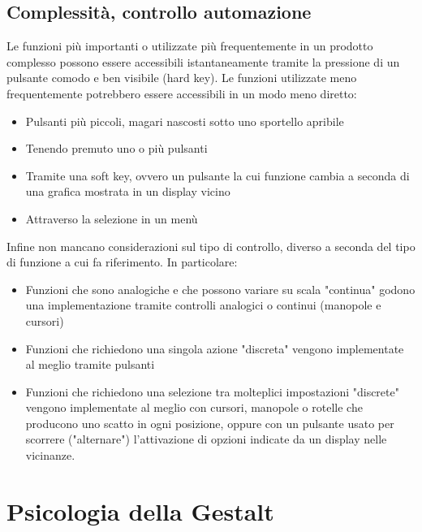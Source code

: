 \documentclass[11pt,a4paper]{article}
\begin{document}
\subsection{Complessità, controllo automazione}
Le funzioni più importanti o utilizzate più frequentemente in un prodotto complesso possono essere accessibili istantaneamente tramite la pressione di un pulsante comodo e ben visibile (hard key). Le funzioni utilizzate meno frequentemente potrebbero essere accessibili in un modo meno diretto:
\begin{itemize}
	\item Pulsanti più piccoli, magari nascosti sotto uno sportello apribile
	\item Tenendo premuto uno o più pulsanti
	\item Tramite una soft key, ovvero un pulsante la cui funzione cambia a seconda di una grafica mostrata in un display vicino
	\item Attraverso la selezione in un menù 
\end{itemize}
Infine non mancano considerazioni sul tipo di controllo, diverso a seconda del tipo di funzione a cui fa riferimento. In particolare:
\begin{itemize}
	\item Funzioni che sono analogiche e che possono variare su scala "continua" godono una implementazione tramite controlli analogici o continui (manopole e cursori)
	\item Funzioni che richiedono una singola azione "discreta" vengono implementate al meglio tramite pulsanti
	\item Funzioni che richiedono una selezione tra molteplici impostazioni "discrete" vengono implementate al meglio con cursori, manopole o rotelle che producono uno scatto in ogni posizione, oppure con un pulsante usato per scorrere ("alternare") l'attivazione di opzioni indicate da un display nelle vicinanze.
\end{itemize}

\section{Psicologia della Gestalt}
\end{document}
